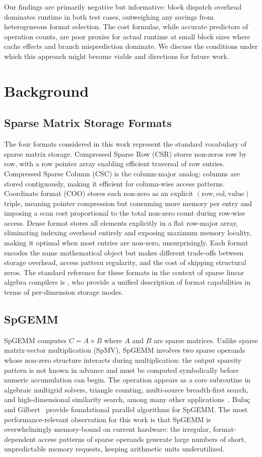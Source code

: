 \documentclass[sigconf, review, anonymous]{acmart}
\begin{document}
Our findings are primarily negative but informative: block dispatch overhead dominates
runtime in both test cases, outweighing any savings from heterogeneous format
selection. The cost formulas, while accurate predictors of operation counts, are poor
proxies for actual runtime at small block sizes where cache effects and branch
misprediction dominate. We discuss the conditions under which this approach might
become viable and directions for future work.

\section{Background}

\subsection{Sparse Matrix Storage Formats}
The four formats considered in this work represent the standard vocabulary of sparse
matrix storage. Compressed Sparse Row (CSR) stores non-zeros row by row, with a row
pointer array enabling efficient traversal of row entries.
Compressed Sparse Column (CSC) is the column-major analog: columns are stored
contiguously, making it efficient for column-wise access patterns. Coordinate format
(COO) stores each non-zero as an explicit $(\text{row}, \text{col}, \text{value})$
triple, meaning pointer compression but consuming more memory per entry and
imposing a scan cost proportional to the total non-zero count during row-wise access.
Dense format stores all elements explicitly in a flat row-major array, eliminating
indexing overhead entirely and exposing maximum memory locality, making it optimal
when most entries are non-zero, unsurprisingly. Each format encodes the same mathematical
object but makes different trade-offs between storage overhead,
access pattern regularity, and the cost of skipping structural zeros.
The standard reference for these formats in the context of sparse linear algebra
compilers is \cite{taco_formats}, who provide a unified description of
format capabilities in terms of per-dimension storage modes.

\subsection{SpGEMM}
SpGEMM computes $C = A \times B$ where $A$ and $B$ are sparse matrices. Unlike sparse
matrix-vector multiplication (SpMV), SpGEMM involves two sparse operands whose
non-zero structure interacts during multiplication: the output sparsity pattern is not
known in advance and must be computed symbolically before numeric accumulation can
begin. The operation appears as a core subroutine in algebraic multigrid solvers,
triangle counting, multi-source breadth-first search, and high-dimensional similarity
search, among many other applications~\cite{spgemm_survey}.
Buluç and Gilbert~\cite{buluc_gilbert}
provide foundational parallel algorithms for SpGEMM.
The most performance-relevant observation for this work is that SpGEMM is overwhelmingly
memory-bound on current hardware: the irregular, format-dependent access patterns of
sparse operands generate large numbers of short, unpredictable memory requests, keeping
arithmetic units underutilized.
\end{document}
